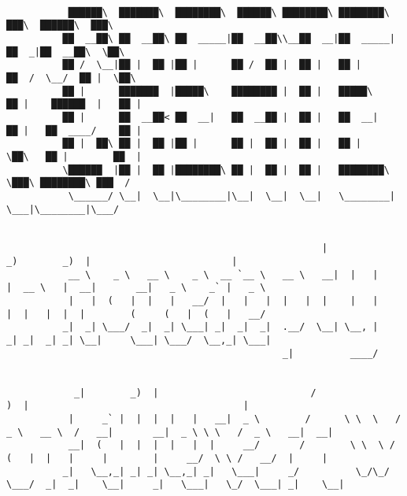 \documentclass[varwidth=\maxdimen,margin=0.5cm,multi={verbatim}]{standalone}
\begin{document}
\begin{verbatim}

           ██████\  ███████\  ████████\  ██████\ ████████\ ████████\      ███\  ██████\  ███\
          ██  __██\ ██  __██\ ██  _____|██  __██\\__██  __|██  _____|    ██  _|██  __██\  \██\
          ██ /  \__|██ |  ██ |██ |      ██ /  ██ |  ██ |   ██ |         ██  /  \__/  ██ |  \██\
          ██ |      ███████  |█████\    ████████ |  ██ |   █████\       ██ |    ██████  |   ██ |
          ██ |      ██  __██< ██  __|   ██  __██ |  ██ |   ██  __|      ██ |   ██  ____/    ██ |
          ██ |  ██\ ██ |  ██ |██ |      ██ |  ██ |  ██ |   ██ |         \██\   ██ |        ██  |
          \██████  |██ |  ██ |████████\ ██ |  ██ |  ██ |   ████████\     \███\ ████████\ ███  /
           \______/ \__|  \__|\________|\__|  \__|  \__|   \________|      \___|\________|\___/


                                                        |              _)        _)  |                         |
           __ \    _ \   __ \    _ \  __ `__ \   __ \   __|  |   |      |  __ \   |  __|       __|   _ \    _` |   _ \
           |   |  (   |  |   |   __/  |   |   |  |   |  |    |   |      |  |   |  |  |        (     (   |  (   |   __/
          _|  _| \___/  _|  _| \___| _|  _|  _|  .__/  \__| \__, |     _| _|  _| _| \__|     \___| \___/  \__,_| \___|
                                                 _|          ____/


            _|        _)  |                           /                              )  |                                      |
           |     _` |  |  |  |   |   __|  _ \        /      \ \  \   /  _ \   __ \  /   __|       __|  _ \ \ \   /  _ \   __|  __|
           __|  (   |  |  |  |   |  |     __/       /        \ \  \ /  (   |  |   |     |        |     __/  \ \ /   __/  |     |
          _|   \__,_| _| _| \__,_| _|   \___|     _/          \_/\_/  \___/  _|  _|    \__|     _|   \___|   \_/  \___| _|    \__|



\end{verbatim}
\end{document}
